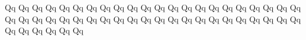 \documentclass{worksheet}
\begin{document}
\begin{drillsheet}
\calligra
Qq Qq Qq Qq Qq Qq Qq Qq Qq Qq Qq Qq Qq Qq Qq Qq Qq Qq Qq Qq Qq Qq Qq Qq Qq Qq Qq Qq Qq Qq Qq Qq Qq Qq Qq Qq Qq Qq Qq Qq Qq Qq Qq Qq Qq Qq Qq Qq Qq Qq
\end{drillsheet}
\end{document}
